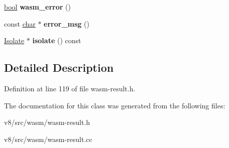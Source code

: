 \begin{DoxyCompactItemize}
\mbox{\hyperlink{classbool}{bool}} {\bfseries wasm\+\_\+error} ()
\item 
\mbox{\label{classv8_1_1internal_1_1wasm_1_1ErrorThrower_ac2be74b2d4f4cf05ce88d34f35b4f330}} 
const \mbox{\hyperlink{classchar}{char}} $\ast$ {\bfseries error\+\_\+msg} ()
\item 
\mbox{\label{classv8_1_1internal_1_1wasm_1_1ErrorThrower_ae7ef1e4832c3d1c1407dd5f2a53c893a}} 
\mbox{\hyperlink{classv8_1_1internal_1_1Isolate}{Isolate}} $\ast$ {\bfseries isolate} () const
\end{DoxyCompactItemize}


\subsection{Detailed Description}


Definition at line 119 of file wasm-\/result.\+h.



The documentation for this class was generated from the following files\+:\begin{DoxyCompactItemize}
\item 
v8/src/wasm/wasm-\/result.\+h\item 
v8/src/wasm/wasm-\/result.\+cc\end{DoxyCompactItemize}

